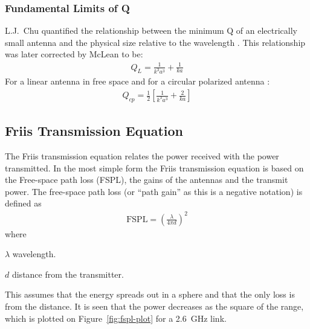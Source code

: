 \subsubsection{Fundamental Limits of Q}
\label{sec:fun_lim}
L.J.\ Chu quantified the relationship between the minimum Q of an electrically small antenna and the physical size relative to the wavelength \cite{chu1948}. This relationship was later corrected by McLean \cite{mclean1996} to be: 
\begin{align}
  Q_L = \frac{1}{k^3a^3}+ \frac{1}{ka}
\end{align}
For a linear antenna in free space and for a circular polarized antenna \cite{mclean1996}:
\begin{align}
  Q_{cp} = \frac{1}{2}  \left[ \frac{1}{k^3a^3} + \frac{2}{ka} \right] 
\end{align}

\subsection{Friis Transmission Equation}
The Friis transmission equation relates the power received with the power transmitted. In the most simple form the Friis transmission equation is based on the Free-space path loss (FSPL), the gains of the antennas and the transmit power. The free-space path loss (or ``path gain'' as this is a negative notation) is defined as \cite{balanis2012antenna}
\begin{align}
  \label{eq:fspl}
  \text{FSPL} = \left( \frac{\lambda}{4 \pi d} \right)^2 
\end{align}
where
\begin{where}
\item[$\lambda$] wavelength.
\item[$d$] distance from the transmitter.
\end{where}
This assumes that the energy spreads out in a sphere and that the only loss is from the distance. It is seen that the power decreases as the square of the range, which is plotted on Figure~\ref{fig:fspl-plot} for a \SI{2.6}{GHz} link.

